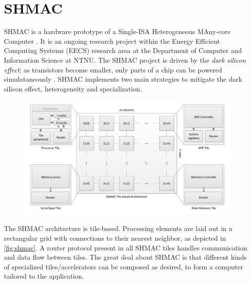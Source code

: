 \section{SHMAC}

SHMAC is a hardware prototype of a Single-ISA Heterogeneous MAny-core Computer
\cite{shmacsliedes, shmacwebpage, Rusten567042}. It is an ongoing research
project within the Energy Efficient Computing Systems (EECS) research area at
the Department of Computer and Information Science at NTNU. The SHMAC project is
driven by the \textit{dark silicon effect}; as transistors become smaller, only
parts of a chip can be powered simulataneously \cite{esmaeilzadeh2011dark}.
SHMAC implements two main strategies to mitigate the dark silicon effect,
heterogeneity and specialization.

\begin{figure}
    \centering
    \includegraphics[width=1.0\textwidth]{figs/shmac-high-level2.png}
    \caption{}
    \label{fig:shmac}
\end{figure}

The SHMAC architecture is tile-based. Processing elements are laid out in a
rectangular grid with connections to their nearest neighbor, as depicted in
\autoref{fig:shmac}. A router protocol present in all SHMAC tiles handles
communication and data flow between tiles.  The great deal about SHMAC is that
different kinds of specialized tiles/accelerators can be composed as desired, to
form a computer tailored to the application.
